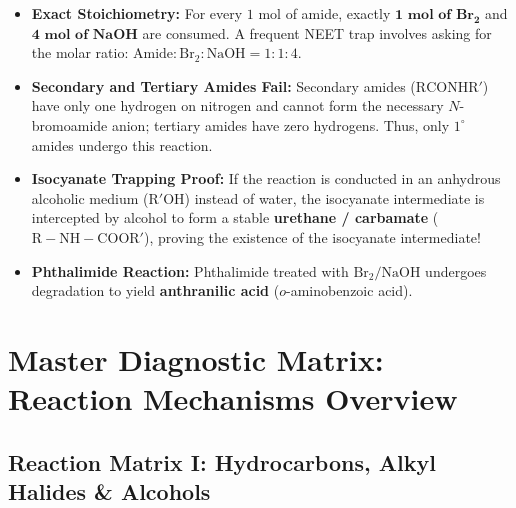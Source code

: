 \documentclass[10pt,twoside,openright]{book}
\begin{document}
\begin{trapbox}
\begin{itemize}
  \item \textbf{Exact Stoichiometry:} For every $1\text{ mol}$ of amide, exactly $\mathbf{1\text{ mol of } Br_2}$ and $\mathbf{4\text{ mol of } NaOH}$ are consumed. A frequent NEET trap involves asking for the molar ratio: $\text{Amide} : \mathrm{Br_2} : \mathrm{NaOH} = 1 : 1 : 4$.
  \item \textbf{Secondary and Tertiary Amides Fail:} Secondary amides ($\mathrm{RCONHR'}$) have only one hydrogen on nitrogen and cannot form the necessary $N$-bromoamide anion; tertiary amides have zero hydrogens. Thus, only $1^\circ$ amides undergo this reaction.
  \item \textbf{Isocyanate Trapping Proof:} If the reaction is conducted in an anhydrous alcoholic medium ($\mathrm{R'OH}$) instead of water, the isocyanate intermediate is intercepted by alcohol to form a stable \textbf{urethane / carbamate} ($\mathrm{R-NH-COOR'}$), proving the existence of the isocyanate intermediate!
  \item \textbf{Phthalimide Reaction:} Phthalimide treated with $\mathrm{Br_2} / \mathrm{NaOH}$ undergoes degradation to yield \textbf{anthranilic acid} ($o$-aminobenzoic acid).
\end{itemize}
\end{trapbox}

\newpage
\section{Master Diagnostic Matrix: Reaction Mechanisms Overview}

\subsection{Reaction Matrix I: Hydrocarbons, Alkyl Halides \& Alcohols}
\end{document}
